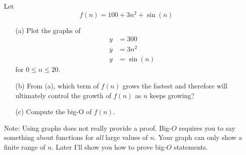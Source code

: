 Let 
\[
f(n) = 100 + 3n^2 + \sin(n)
\]
\begin{itemize}
\item[(a)] Plot the graphs of 
\begin{align*}
y &= 300 \\
y &= 3n^2 \\
y &= \sin(n)
\end{align*}
for $0 \leq n \leq 20$.
\item[(b)] From (a), which term of $f(n)$ grows the fastest
and therefore will ultimately control
the growth of $f(n)$ as $n$ keeps growing? 
\item[(c)] Compute the big-O of $f(n)$.
\end{itemize}
Note: Using graphs does not really provide a proof.
Big-$O$ requires you to say something about functions
for \textit{all} large values of $n$.
Your graph can only show a finite range of $n$.
Later I'll show you how to prove big-$O$ statements.
